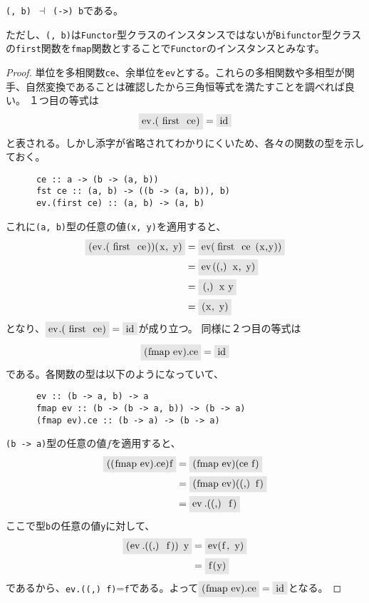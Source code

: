 \documentclass[uplatex,dvipdfmx]{jsarticle}
\newcommand{\pr}[1]{\colorbox[rgb]{0.9,0.9,0.9}{\lstinline{#1}}}
\begin{document}
  \begin{prop}[べき随伴]\label{prop-h-has-exp-adjoint}
    \pr{(, b)}\ $\dashv $\ \pr{(->) b}である。

    ただし、\pr{(, b)}は\pr{Functor}型クラスのインスタンスではないが\pr{Bifunctor}型クラスの\pr{first}関数を\pr{fmap}関数とすることで\pr{Functor}のインスタンスとみなす。
  \end{prop}
  \begin{proof}
    単位を多相関数\pr{ce}、余単位を\pr{ev}とする。これらの多相関数や多相型が関手、自然変換であることは確認したから三角恒等式を満たすことを調べれば良い。
    １つ目の等式は\[\pr{ev.(first ce)}=\pr{id}\]と表される。しかし添字が省略されてわかりにくいため、各々の関数の型を示しておく。
    \begin{lstlisting}
      ce :: a -> (b -> (a, b))
      fst ce :: (a, b) -> ((b -> (a, b)), b)
      ev.(first ce) :: (a, b) -> (a, b)
    \end{lstlisting}
    これに\pr{(a, b)}型の任意の値\pr{(x, y)}を適用すると、
    \begin{align*}
      \pr{(ev.(first ce))(x, y)}&=\pr{ev(first ce (x,y))}\\
      &=\pr{ev((,) x, y)}\\
      &=\pr{(,) x y}\\
      &=\pr{(x, y)}
    \end{align*}
    となり、$\pr{ev.(first ce)}=\pr{id}$が成り立つ。
    同様に２つ目の等式は\[\pr{(fmap ev).ce}=\pr{id}\]である。各関数の型は以下のようになっていて、
    \begin{lstlisting}
      ev :: (b -> a, b) -> a
      fmap ev :: (b -> (b -> a, b)) -> (b -> a)
      (fmap ev).ce :: (b -> a) -> (b -> a)
    \end{lstlisting}
    \pr{(b -> a)}型の任意の値$f$を適用すると、
    \begin{align*}
      \pr{((fmap ev).ce)f} &= \pr{(fmap ev)(ce f)}\\
      &=\pr{(fmap ev)((,) f)}\\
      &=\pr{ev.((,) f)}\\
    \end{align*}
    ここで型\pr{b}の任意の値\pr{y}に対して、\\
    \begin{align*}
      \pr{(ev.((,) f)) y} &= \pr{ev(f, y)}\\
      &= \pr{f(y)}\\
    \end{align*}
    であるから、\pr{ev.((,) f)}=\pr{f}である。よって$\pr{(fmap ev).ce}=\pr{id}$となる。
  \end{proof}
\end{document}
